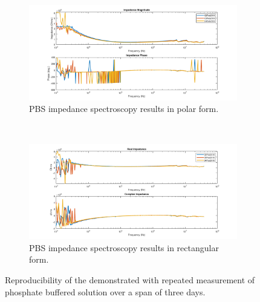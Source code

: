 \begin{figure}[h]
    \centering
    \begin{subfigure}[b]{\textwidth}
        \centering
        \includegraphics[width=\textwidth]{images/reproducibility_PBS_mag_phase.png}
        \caption{PBS impedance spectroscopy results in polar form.}
    \end{subfigure}
    \\
    \vspace{0.1 in}
    \begin{subfigure}[b]{\textwidth}
        \centering
        \includegraphics[width=\textwidth]{images/reproducibility_PBS_real_imag.png}
        \caption{PBS impedance spectroscopy results in rectangular form.}
    \end{subfigure}
    \caption{Reproducibility of the demonstrated with repeated measurement of phosphate buffered solution over a span of three days.}
    \label{fig:IS_data_reproducibility}
\end{figure}

